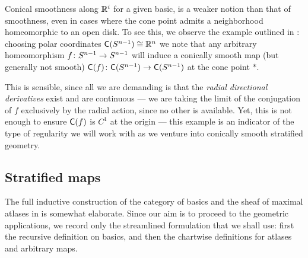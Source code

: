 \begin{observation}\label{ch4:: obs: con smooth circles}
Conical smoothness along $\mathbb R^{i}$ for a given basic, is a weaker notion than that of smoothness, even in cases where the cone point admits a neighborhood homeomorphic to an open disk. To see this, we observe the example outlined in \cite[Example 3.1.9]{AFT1}: choosing polar coordinates $\mathsf C(S^{n-1})\cong \mathbb R^{n}$ we note that any arbitrary homeomorphism $f\colon S^{n-1} \rightarrow S^{n-1}$ will induce a conically smooth map (but generally not smooth) $\mathsf C(f)\colon \mathsf C(S^{n-1}) \rightarrow \mathsf C(S^{n-1})$ at the cone point $*$. 

\medskip

\nid This is sensible, since all we are demanding is that the \emph{radial directional derivatives} exist and are continuous — we are taking the limit of the conjugation of $f$ exclusively by the radial action, since no other is available. Yet, this is not enough to ensure $\mathsf C(f)$ is $C^1$ at the origin — this example is an indicator of the type of regularity we will work with as we venture into conically smooth stratified geometry.   
\end{observation}



\subsection{Stratified maps}

The full inductive construction of the category of basics and the sheaf of maximal atlases in \cite[Section~3.2]{AFT1} is somewhat elaborate. Since our aim is to proceed to the geometric applications, we record only the streamlined formulation that we shall use: first the recursive definition on basics, and then the chartwise definitions for atlases and arbitrary maps.


